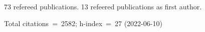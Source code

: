 73 refereed publications. 13 refeered publications as first author.

Total citations~=~2582; h-index~=~27 (2022-06-10)